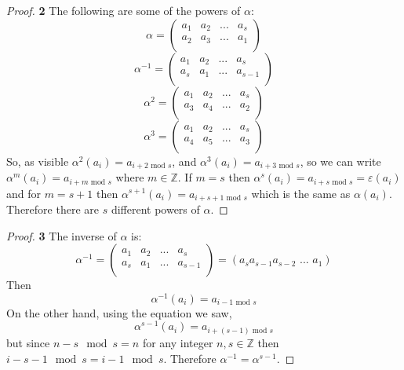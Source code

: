 \documentclass[11pt]{article}
\begin{document}
\cleardoublepage
		\begin{proof}{\textbf{2}}
			The following are some of the powers of $\alpha$:
				$$\alpha = \begin{pmatrix}
					a_1 & a_2 & ... & a_s \\
					a_2 & a_3 & ... & a_1 \\
				\end{pmatrix}
				$$
				$$\alpha^{-1} = \begin{pmatrix}
					a_1 & a_2 & ... & a_s \\
					a_s & a_1 & ... & a_{s-1} \\
				\end{pmatrix}
				$$
				$$\alpha^{2} = \begin{pmatrix}
					a_1 & a_2 & ... & a_s \\
					a_3 & a_4 & ... & a_2 \\
				\end{pmatrix}$$
				$$\alpha^{3} = \begin{pmatrix}
					a_1 & a_2 & ... & a_s \\
					a_4 & a_5 & ... & a_3 \\
				\end{pmatrix}$$
			So, as visible $\alpha^{2}(a_i) = a_{i + 2 \text{ mod } s}$, and $\alpha^{3}(a_i) = a_{i + 3 \text{ mod } s}$, so we can write $\alpha^{m}(a_i) = a_{i + m \text{ mod } s}$ where $m \in \mathbb{Z}$. If $m=s$ then $\alpha^{s}(a_i) = a_{i + s \text{ mod } s}=\varepsilon(a_i)$ and for $m=s+1$ then $\alpha^{s+1}(a_i) = a_{i + s + 1 \text{ mod } s}$ which is the same as $\alpha(a_i)$. Therefore there are $s$ different powers of $\alpha$.
		\end{proof}
		\begin{proof}{\textbf{3}}
			The inverse of $\alpha$ is:
			$$\alpha^{-1} = \begin{pmatrix}
				a_1 & a_2 & ... & a_s \\
				a_s & a_1 & ... & a_{s-1} \\
			\end{pmatrix} = (a_{s}a_{s-1}a_{s-2} \text{ ... } a_1)$$
			Then \\
			$$ \alpha^{-1}(a_i) = a_{i-1 \text{ mod }s}$$
			On the other hand, using the equation we saw,
			$$\alpha^{s-1}(a_i) = a_{i+(s-1) \text{ mod }s}$$
			but since $n-s \mod s = n$ for any integer $n,s \in \mathbb{Z}$ then $i -s -1 \mod s = i -1 \mod s$. Therefore $\alpha^{-1}=\alpha^{s-1}$.
		\end{proof}
\end{document}
